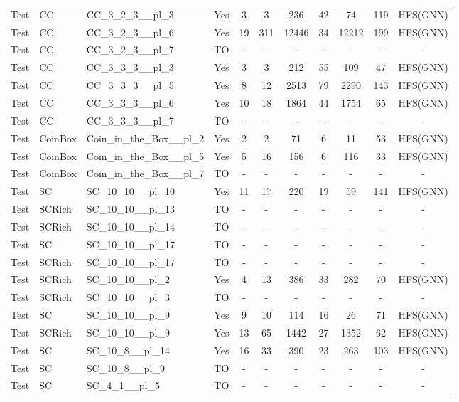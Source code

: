 \documentclass{article}
\begin{document}
\begin{tabular}{lllcccccccc}
Test & CC & CC\_3\_2\_3\_\_pl\_3 & Yes & 3 & 3 & 236 & 42 & 74 & 119 & HFS(GNN) \\
Test & CC & CC\_3\_2\_3\_\_pl\_6 & Yes & 19 & 311 & 12446 & 34 & 12212 & 199 & HFS(GNN) \\
Test & CC & CC\_3\_2\_3\_\_pl\_7 & TO & - & - & - & - & - & - & - \\
Test & CC & CC\_3\_3\_3\_\_pl\_3 & Yes & 3 & 3 & 212 & 55 & 109 & 47 & HFS(GNN) \\
Test & CC & CC\_3\_3\_3\_\_pl\_5 & Yes & 8 & 12 & 2513 & 79 & 2290 & 143 & HFS(GNN) \\
Test & CC & CC\_3\_3\_3\_\_pl\_6 & Yes & 10 & 18 & 1864 & 44 & 1754 & 65 & HFS(GNN) \\
Test & CC & CC\_3\_3\_3\_\_pl\_7 & TO & - & - & - & - & - & - & - \\
Test & CoinBox & Coin\_in\_the\_Box\_\_pl\_2 & Yes & 2 & 2 & 71 & 6 & 11 & 53 & HFS(GNN) \\
Test & CoinBox & Coin\_in\_the\_Box\_\_pl\_5 & Yes & 5 & 16 & 156 & 6 & 116 & 33 & HFS(GNN) \\
Test & CoinBox & Coin\_in\_the\_Box\_\_pl\_7 & TO & - & - & - & - & - & - & - \\
Test & SC & SC\_10\_10\_\_pl\_10 & Yes & 11 & 17 & 220 & 19 & 59 & 141 & HFS(GNN) \\
Test & SCRich & SC\_10\_10\_\_pl\_13 & TO & - & - & - & - & - & - & - \\
Test & SCRich & SC\_10\_10\_\_pl\_14 & TO & - & - & - & - & - & - & - \\
Test & SC & SC\_10\_10\_\_pl\_17 & TO & - & - & - & - & - & - & - \\
Test & SCRich & SC\_10\_10\_\_pl\_17 & TO & - & - & - & - & - & - & - \\
Test & SCRich & SC\_10\_10\_\_pl\_2 & Yes & 4 & 13 & 386 & 33 & 282 & 70 & HFS(GNN) \\
Test & SCRich & SC\_10\_10\_\_pl\_3 & TO & - & - & - & - & - & - & - \\
Test & SC & SC\_10\_10\_\_pl\_9 & Yes & 9 & 10 & 114 & 16 & 26 & 71 & HFS(GNN) \\
Test & SCRich & SC\_10\_10\_\_pl\_9 & Yes & 13 & 65 & 1442 & 27 & 1352 & 62 & HFS(GNN) \\
Test & SC & SC\_10\_8\_\_pl\_14 & Yes & 16 & 33 & 390 & 23 & 263 & 103 & HFS(GNN) \\
Test & SC & SC\_10\_8\_\_pl\_9 & TO & - & - & - & - & - & - & - \\
Test & SC & SC\_4\_1\_\_pl\_5 & TO & - & - & - & - & - & - & - \\

\end{tabular}
\end{document}
